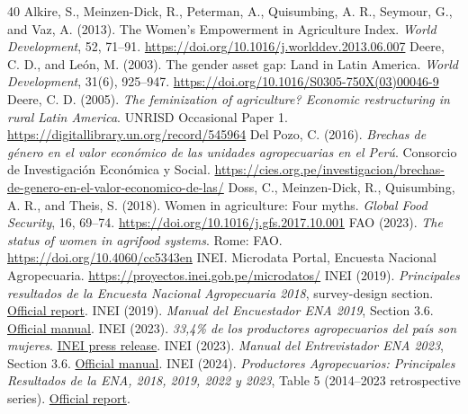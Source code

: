 \documentclass[11pt,a4paper]{article}
\begin{document}
\begin{thebibliography}{40}\small
{} Alkire, S., Meinzen-Dick, R., Peterman, A., Quisumbing, A. R., Seymour, G., and Vaz, A. (2013). The Women's Empowerment in Agriculture Index. \emph{World Development}, 52, 71--91. \url{https://doi.org/10.1016/j.worlddev.2013.06.007}
 Deere, C. D., and Le\'on, M. (2003). The gender asset gap: Land in Latin America. \emph{World Development}, 31(6), 925--947. \url{https://doi.org/10.1016/S0305-750X(03)00046-9}
 Deere, C. D. (2005). \emph{The feminization of agriculture? Economic restructuring in rural Latin America}. UNRISD Occasional Paper 1. \url{https://digitallibrary.un.org/record/545964}
 Del Pozo, C. (2016). \emph{Brechas de g\'enero en el valor econ\'omico de las unidades agropecuarias en el Per\'u}. Consorcio de Investigaci\'on Econ\'omica y Social. \url{https://cies.org.pe/investigacion/brechas-de-genero-en-el-valor-economico-de-las/}
 Doss, C., Meinzen-Dick, R., Quisumbing, A. R., and Theis, S. (2018). Women in agriculture: Four myths. \emph{Global Food Security}, 16, 69--74. \url{https://doi.org/10.1016/j.gfs.2017.10.001}
 FAO (2023). \emph{The status of women in agrifood systems}. Rome: FAO. \url{https://doi.org/10.4060/cc5343en}
 INEI. Microdata Portal, Encuesta Nacional Agropecuaria. \url{https://proyectos.inei.gob.pe/microdatos/}
 INEI (2019). \emph{Principales resultados de la Encuesta Nacional Agropecuaria 2018}, survey-design section. \href{https://www.inei.gob.pe/media/MenuRecursivo/publicaciones_digitales/Est/Lib1697/libro.pdf}{Official report}.
 INEI (2019). \emph{Manual del Encuestador ENA 2019}, Section 3.6. \href{https://proyectos.inei.gob.pe/iinei/srienaho/Descarga/DocumentosMetodologicos/2019-62/04_MANUAL_DEL_ENCUESTADOR_ENA_2019.pdf}{Official manual}.
 INEI (2023). \emph{33,4\% de los productores agropecuarios del pa\'is son mujeres}. \href{https://m.inei.gob.pe/prensa/noticias/334-de-los-productores-agropecuarios-del-pais-son-mujeres-14486/}{INEI press release}.
 INEI (2023). \emph{Manual del Entrevistador ENA 2023}, Section 3.6. \href{https://proyectos.inei.gob.pe/iinei/srienaho/Descarga/DocumentosMetodologicos/2023-62/03_MANUAL_DEL_ENTREVISTADOR_ENA_2023.pdf}{Official manual}.
 INEI (2024). \emph{Productores Agropecuarios: Principales Resultados de la ENA, 2018, 2019, 2022 y 2023}, Table 5 (2014--2023 retrospective series). \href{https://proyectos.inei.gob.pe/iinei/srienaho/Descarga/DocumentosMetodologicos/2023-62/05_PUBLICACION_ENA_2023.pdf}{Official report}.

\end{thebibliography}
\end{document}
